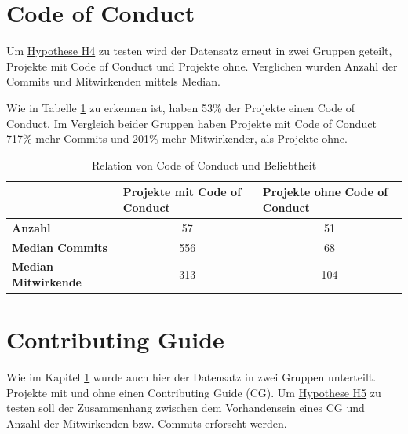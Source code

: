 \newpage %
\section{Code of Conduct}\label{sec:CoC}
Um \hyperref[H:4]{Hypothese H4} zu testen wird
der Datensatz erneut in zwei Gruppen geteilt, Projekte mit Code of Conduct und Projekte
ohne. Verglichen wurden Anzahl der Commits und Mitwirkenden mittels Median. 

Wie in Tabelle \ref{tab:relation_CoC_Popularity} zu erkennen ist, haben 53\% der Projekte einen
Code of Conduct. Im Vergleich beider Gruppen haben Projekte mit Code of Conduct 717\% mehr
Commits und 201\% mehr Mitwirkender, als Projekte ohne.


\begin{table}[h]
    \begin{tabular}{l|c|c|}
        \cline{2-3}
                                    & \multicolumn{1}{l|}{\textbf{Projekte mit Code of Conduct}} & \multicolumn{1}{l|}{\textbf{Projekte ohne Code of Conduct}} \\ \hline
        \textbf{Anzahl}             & 57                                                         & 51                                                          \\ \hline
        \textbf{Median Commits}     & 556                                                        & 68                                                          \\ \hline
        \textbf{Median Mitwirkende} & 313                                                        & 104                                                         \\ \cline{2-3}
    \end{tabular}%
    \caption{Relation von Code of Conduct und Beliebtheit}
    \label{tab:relation_CoC_Popularity}
\end{table}





\newpage %
\section{Contributing Guide}

Wie im Kapitel \ref{sec:CoC} wurde auch hier der Datensatz in zwei Gruppen unterteilt. Projekte mit
und ohne einen Contributing Guide (CG). Um \hyperref[H:5]{Hypothese H5} zu testen soll der Zusammenhang
zwischen dem Vorhandensein eines CG und Anzahl der Mitwirkenden bzw. Commits erforscht werden.


